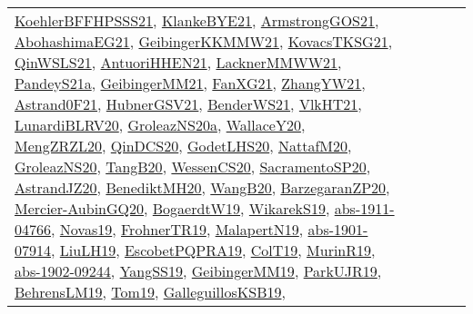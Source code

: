 {\begin{longtable}{lp{3cm}>{\raggedright}p{6cm}>{\raggedright}p{6cm}p{8cm}}
\href{articles/KoehlerBFFHPSSS21.pdf}{KoehlerBFFHPSSS21}\cite{KoehlerBFFHPSSS21}, \href{papers/KlankeBYE21.pdf}{KlankeBYE21}\cite{KlankeBYE21}, \href{papers/ArmstrongGOS21.pdf}{ArmstrongGOS21}\cite{ArmstrongGOS21}, \href{articles/AbohashimaEG21.pdf}{AbohashimaEG21}\cite{AbohashimaEG21}, \href{papers/GeibingerKKMMW21.pdf}{GeibingerKKMMW21}\cite{GeibingerKKMMW21}, \href{papers/KovacsTKSG21.pdf}{KovacsTKSG21}\cite{KovacsTKSG21}, \href{articles/QinWSLS21.pdf}{QinWSLS21}\cite{QinWSLS21}, \href{papers/AntuoriHHEN21.pdf}{AntuoriHHEN21}\cite{AntuoriHHEN21}, \href{papers/LacknerMMWW21.pdf}{LacknerMMWW21}\cite{LacknerMMWW21}, \href{articles/PandeyS21a.pdf}{PandeyS21a}\cite{PandeyS21a}, \href{papers/GeibingerMM21.pdf}{GeibingerMM21}\cite{GeibingerMM21}, \href{articles/FanXG21.pdf}{FanXG21}\cite{FanXG21}, \href{articles/ZhangYW21.pdf}{ZhangYW21}\cite{ZhangYW21}, \href{papers/Astrand0F21.pdf}{Astrand0F21}\cite{Astrand0F21}, \href{articles/HubnerGSV21.pdf}{HubnerGSV21}\cite{HubnerGSV21}, \href{papers/BenderWS21.pdf}{BenderWS21}\cite{BenderWS21}, \href{articles/VlkHT21.pdf}{VlkHT21}\cite{VlkHT21}, \href{articles/LunardiBLRV20.pdf}{LunardiBLRV20}\cite{LunardiBLRV20}, \href{papers/GroleazNS20a.pdf}{GroleazNS20a}\cite{GroleazNS20a}, \href{articles/WallaceY20.pdf}{WallaceY20}\cite{WallaceY20}, \href{articles/MengZRZL20.pdf}{MengZRZL20}\cite{MengZRZL20}, \href{articles/QinDCS20.pdf}{QinDCS20}\cite{QinDCS20}, \href{papers/GodetLHS20.pdf}{GodetLHS20}\cite{GodetLHS20}, \href{papers/NattafM20.pdf}{NattafM20}\cite{NattafM20}, \href{papers/GroleazNS20.pdf}{GroleazNS20}\cite{GroleazNS20}, \href{papers/TangB20.pdf}{TangB20}\cite{TangB20}, \href{papers/WessenCS20.pdf}{WessenCS20}\cite{WessenCS20}, \href{articles/SacramentoSP20.pdf}{SacramentoSP20}\cite{SacramentoSP20}, \href{articles/AstrandJZ20.pdf}{AstrandJZ20}\cite{AstrandJZ20}, \href{articles/BenediktMH20.pdf}{BenediktMH20}\cite{BenediktMH20}, \href{papers/WangB20.pdf}{WangB20}\cite{WangB20}, \href{papers/BarzegaranZP20.pdf}{BarzegaranZP20}\cite{BarzegaranZP20}, \href{papers/Mercier-AubinGQ20.pdf}{Mercier-AubinGQ20}\cite{Mercier-AubinGQ20}, \href{papers/BogaerdtW19.pdf}{BogaerdtW19}\cite{BogaerdtW19}, \href{articles/WikarekS19.pdf}{WikarekS19}\cite{WikarekS19}, \href{articles/abs-1911-04766.pdf}{abs-1911-04766}\cite{abs-1911-04766}, \href{articles/Novas19.pdf}{Novas19}\cite{Novas19}, \href{papers/FrohnerTR19.pdf}{FrohnerTR19}\cite{FrohnerTR19}, \href{papers/MalapertN19.pdf}{MalapertN19}\cite{MalapertN19}, \href{articles/abs-1901-07914.pdf}{abs-1901-07914}\cite{abs-1901-07914}, \href{papers/LiuLH19.pdf}{LiuLH19}\cite{LiuLH19}, \href{articles/EscobetPQPRA19.pdf}{EscobetPQPRA19}\cite{EscobetPQPRA19}, \href{papers/ColT19.pdf}{ColT19}\cite{ColT19}, \href{papers/MurinR19.pdf}{MurinR19}\cite{MurinR19}, \href{articles/abs-1902-09244.pdf}{abs-1902-09244}\cite{abs-1902-09244}, \href{papers/YangSS19.pdf}{YangSS19}\cite{YangSS19}, \href{papers/GeibingerMM19.pdf}{GeibingerMM19}\cite{GeibingerMM19}, \href{papers/ParkUJR19.pdf}{ParkUJR19}\cite{ParkUJR19}, \href{papers/BehrensLM19.pdf}{BehrensLM19}\cite{BehrensLM19}, \href{papers/Tom19.pdf}{Tom19}\cite{Tom19}, \href{papers/GalleguillosKSB19.pdf}{GalleguillosKSB19}\cite{GalleguillosKSB19}, 
\end{longtable}}
